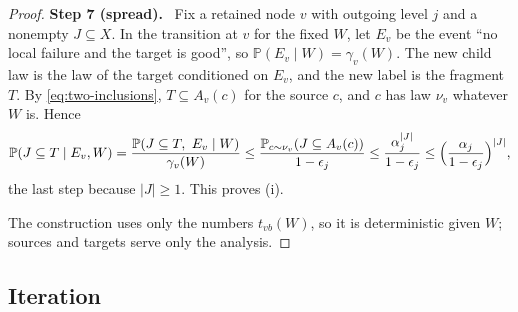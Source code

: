 \documentclass[11pt]{article}
\numberwithin{equation}{section}
\newcommand{\PP}{\mathbb P}
\newcommand{\step}[1]{\par\smallskip\noindent\textbf{Step #1.}\ }
\begin{document}
\begin{proof}
\step{7 (spread)} Fix a retained node $v$ with outgoing level $j$ and a
nonempty $J\subseteq X$. In the transition at $v$ for the fixed $W$, let
$E_v$ be the event ``no local failure and the target is good'', so
$\PP(E_v\mid W)=\gamma_v(W)$. The new child law is the law of the target
conditioned on $E_v$, and the new label is the fragment $T$. By
\eqref{eq:two-inclusions}, $T\subseteq A_v(c)$ for the source $c$, and
$c$ has law $\nu_v$ whatever $W$ is. Hence
\[
 \PP(J\subseteq T\mid E_v,W)
 =\frac{\PP(J\subseteq T,\ E_v\mid W)}{\gamma_v(W)}
 \le\frac{\PP_{c\sim\nu_v}(J\subseteq A_v(c))}{1-\epsilon_j}
 \le\frac{\alpha_j^{|J|}}{1-\epsilon_j}
 \le\Bigl(\frac{\alpha_j}{1-\epsilon_j}\Bigr)^{|J|},
\]
the last step because $|J|\ge1$. This proves (i).

The construction uses only the numbers $t_{vb}(W)$, so it is
deterministic given $W$; sources and targets serve only the analysis.
\end{proof}

\subsection{Iteration}
\end{document}
